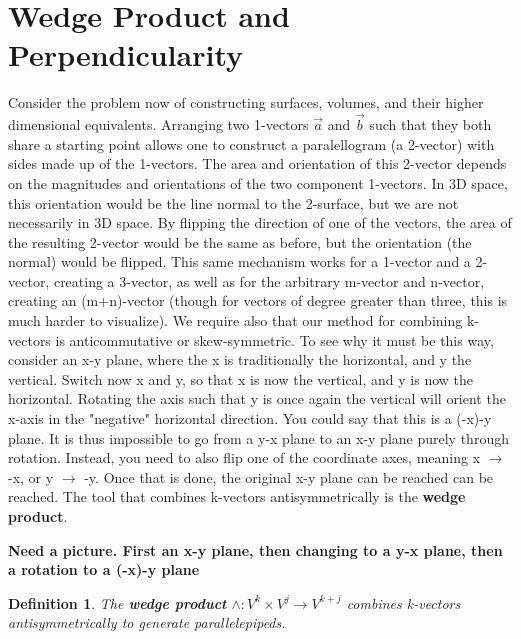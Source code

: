 \documentclass{book}
\newtheorem{defn}[equation]{Definition}
\begin{document}
\section{Wedge Product and Perpendicularity}

Consider the problem now of constructing surfaces, volumes, and their higher dimensional equivalents. Arranging two 1-vectors $\vec{a}$ and $\vec{b}$ such that they both share a starting point allows one to construct a paralellogram (a 2-vector) with sides made up of the 1-vectors. The area and orientation of this 2-vector depends on the magnitudes and orientations of the two component 1-vectors. In 3D space, this orientation would be the line normal to the 2-surface, but we are not necessarily in 3D space. By flipping the direction of one of the vectors, the area of the resulting 2-vector would be the same as before, but the orientation (the normal) would be flipped. This same mechanism works for a 1-vector and a 2-vector, creating a 3-vector, as well as for the arbitrary m-vector and n-vector, creating an (m+n)-vector (though for vectors of degree greater than three, this is much harder to visualize). We require also that our method for combining k-vectors is anticommutative or skew-symmetric. To see why it must be this way, consider an x-y plane, where the x is traditionally the horizontal, and y the vertical. Switch now x and y, so that x is now the vertical, and y is now the horizontal. Rotating the axis such that y is once again the vertical will orient the x-axis in the "negative" horizontal direction. You could say that this is a (-x)-y plane. It is thus impossible to go from a y-x plane to an x-y plane purely through rotation. Instead, you need to also flip one of the coordinate axes, meaning x $\to$ -x, or y $\to$ -y. Once that is done, the original x-y plane can be reached can be reached. The tool that combines k-vectors antisymmetrically is the \textbf{wedge product}.

\textbf{Need a picture. First an x-y plane, then changing to a y-x plane, then a rotation to a (-x)-y plane}

\begin{defn}
	
	The \textbf{wedge product} $\wedge : V^k\times V^j \to V^{k+j}$ combines k-vectors antisymmetrically to generate parallelepipeds. 
\end{defn}
\end{document}
